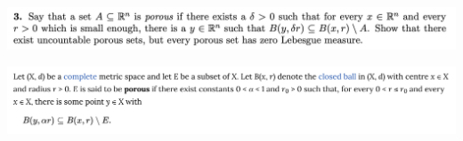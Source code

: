 








\newpage
\begin{mdframed}
  \includegraphics[width=400pt]{img/analysis--berkeley-202a-final-ef68.png}
\end{mdframed}


\begin{mdframed}
  \includegraphics[width=400pt]{img/analysis--berkeley-202a-final-b463.png}
\end{mdframed}

